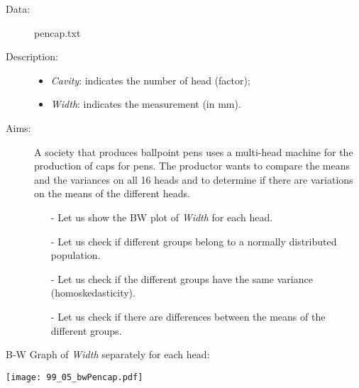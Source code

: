 \begin{frame}
  \begin{description}
    \item[Data: ]pencap.txt \\ 
    \item[Description: ]
      \begin{footnotesize}
        \begin{itemize}
          \item \textit{Cavity}: indicates the number of head (factor);
          \item \textit{Width}: indicates the measurement (in mm).
        \end{itemize}
      \end{footnotesize}
    \item[Aims: ]
      \begin{footnotesize}
        A society that produces ballpoint pens uses a multi-head machine for the production of caps for pens. The productor wants to compare the means and the variances on all 16 heads and to determine if there are variations on the means of the different heads.
        \begin{itemize}
          \item[-] Let us show the BW plot of \textit{Width} for each head.
          \item[-] Let us check if different groups belong to a normally distributed population.
          \item[-] Let us check if the different groups have the same variance (homoskedasticity).
          \item[-] Let us check if there are differences between the means of the different groups.
        \end{itemize}
      \end{footnotesize}
  \end{description}
\end{frame}

\begin{frame}
  B-W Graph of \textit{Width} separately for each head:\\
  \vspace{-0.5cm}
  \begin{center}
    \texttt{[image: 99\_05\_bwPencap.pdf]}
  \end{center}
\end{frame}

